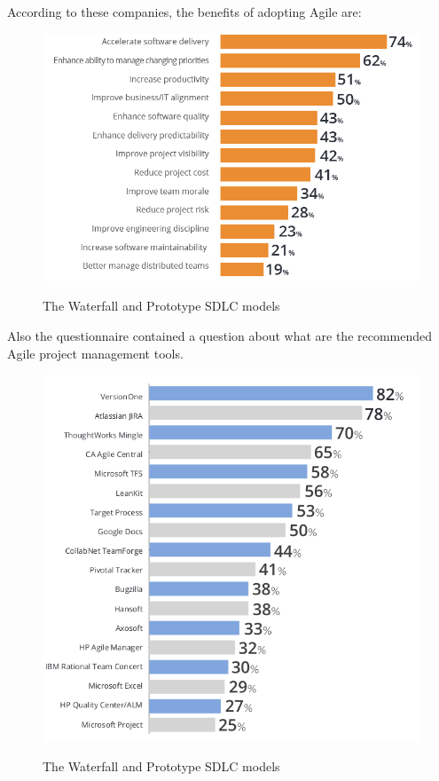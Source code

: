 
	According to these companies, the benefits of adopting Agile are:
	\begin{figure}[H]
		\centering
		\includegraphics[width=.8\textwidth]{resources/Untitled}\\
		\caption{The Waterfall and Prototype SDLC models}
	\end{figure}

	Also the questionnaire contained a question about what are the recommended Agile project management tools.
	
	\begin{figure}[H]
		\centering
		\includegraphics[width=.8\textwidth]{resources/Screenshot}\\
		\caption{The Waterfall and Prototype SDLC models}
	\end{figure}


